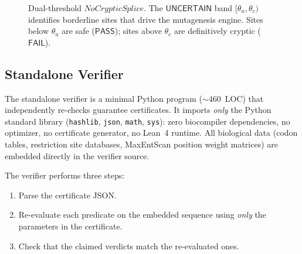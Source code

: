 \documentclass[acmsmall,review,anonymous]{acmart}
\newcommand{\PASS}{\ensuremath{\mathsf{PASS}}\xspace}
\newcommand{\FAIL}{\ensuremath{\mathsf{FAIL}}\xspace}
\newcommand{\UNCERTAIN}{\ensuremath{\mathsf{UNCERTAIN}}\xspace}
\begin{document}
\begin{figure}[t]
\centering
{}
\caption{Dual-threshold $\mathit{NoCrypticSplice}$.
         The \UNCERTAIN{} band $[\theta_u, \theta_c)$ identifies
         borderline sites that drive the mutagenesis engine.
         Sites below $\theta_u$ are safe (\PASS); sites above
         $\theta_c$ are definitively cryptic (\FAIL).}
\label{fig:dualthresh}
\end{figure}

\subsection{Standalone Verifier}\label{sec:verifier}

The standalone verifier is a minimal Python program (${\sim}460$~LOC)
that independently re-checks guarantee certificates.
It imports \emph{only} the Python standard library
(\texttt{hashlib}, \texttt{json}, \texttt{math}, \texttt{sys}):
zero biocompiler dependencies, no optimizer, no certificate generator,
no Lean~4 runtime.
All biological data (codon tables, restriction site databases,
MaxEntScan position weight matrices) are embedded directly in the
verifier source.

The verifier performs three steps:
\begin{enumerate}[leftmargin=*,itemsep=0pt,topsep=1pt]
\item Parse the certificate JSON.
\item Re-evaluate each predicate on the embedded sequence using
      \emph{only} the parameters in the certificate.
\item Check that the claimed verdicts match the re-evaluated ones.
\end{enumerate}
\end{document}
